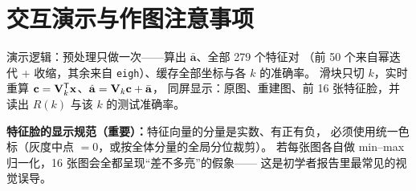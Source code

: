 \section{交互演示与作图注意事项}

演示逻辑：预处理只做一次——算出 $\bar{\mathbf{a}}$、全部 279 个特征对
（前 50 个来自幂迭代 + 收缩，其余来自 \texttt{eigh}）、缓存全部坐标与各 $k$ 的准确率。
滑块只切 $k$，实时重算 $\mathbf{c}=\mathbf{V}_k^{\mathsf{T}}\mathbf{x}$、$\hat{\mathbf{a}}=\mathbf{V}_k\mathbf{c}+\bar{\mathbf{a}}$，
同屏显示：原图、重建图、前 16 张特征脸，并读出 $R(k)$ 与该 $k$ 的测试准确率。

\textbf{特征脸的显示规范（重要）：}特征向量的分量是实数、有正有负，
必须使用统一色标（灰度中点 $=0$，或按全体分量的全局分位裁剪）。
若每张图各自做 min--max 归一化，16 张图会全都呈现“差不多亮”的假象——
这是初学者报告里最常见的视觉误导。
